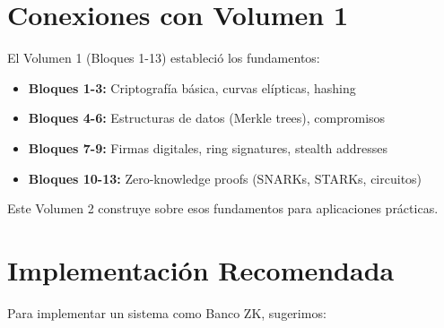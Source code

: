 \documentclass[11pt,a4paper,twoside]{book}
\theoremstyle{definition}
\theoremstyle{remark}
\begin{document}
\section*{Conexiones con Volumen 1}

El Volumen 1 (Bloques 1-13) estableció los fundamentos:
\begin{itemize}
    \item \textbf{Bloques 1-3:} Criptografía básica, curvas elípticas, hashing
    \item \textbf{Bloques 4-6:} Estructuras de datos (Merkle trees), compromisos
    \item \textbf{Bloques 7-9:} Firmas digitales, ring signatures, stealth addresses
    \item \textbf{Bloques 10-13:} Zero-knowledge proofs (SNARKs, STARKs, circuitos)
\end{itemize}

Este Volumen 2 construye sobre esos fundamentos para aplicaciones prácticas.

\section*{Implementación Recomendada}

Para implementar un sistema como Banco ZK, sugerimos:
\end{document}
